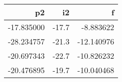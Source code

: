 \begin{tabular}{rrr}
\toprule
        p2 &    i2 &          f \\
\midrule
-17.835000 & -17.7 &  -8.883622 \\
-28.234757 & -21.3 & -12.140976 \\
-20.697343 & -22.7 & -10.826232 \\
-20.476895 & -19.7 & -10.040468 \\
\bottomrule
\end{tabular}
